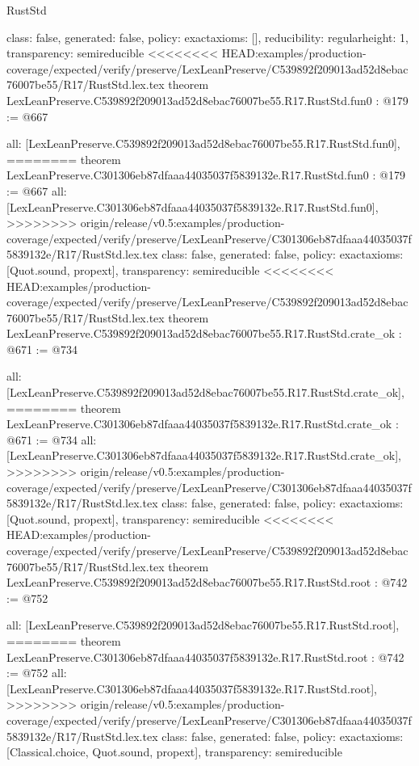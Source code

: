 \begin{lexlean}{RustStd}
\begin{coremodule}
{\begin{coremodule}
{{{  class: false,
  generated: false,
  policy: exact{axioms: []},
  reducibility: regular{height: 1},
  transparency: semireducible
}
<<<<<<<< HEAD:examples/production-coverage/expected/verify/preserve/LexLeanPreserve/C539892f209013ad52d8ebac76007be55/R17/RustStd.lex.tex
theorem LexLeanPreserve.C539892f209013ad52d8ebac76007be55.R17.RustStd.fun0 : @179 := @667 {
  all: [LexLeanPreserve.C539892f209013ad52d8ebac76007be55.R17.RustStd.fun0],
========
theorem LexLeanPreserve.C301306eb87dfaaa44035037f5839132e.R17.RustStd.fun0 : @179 := @667 {
  all: [LexLeanPreserve.C301306eb87dfaaa44035037f5839132e.R17.RustStd.fun0],
>>>>>>>> origin/release/v0.5:examples/production-coverage/expected/verify/preserve/LexLeanPreserve/C301306eb87dfaaa44035037f5839132e/R17/RustStd.lex.tex
  class: false,
  generated: false,
  policy: exact{axioms: [Quot.sound, propext]},
  transparency: semireducible
}
<<<<<<<< HEAD:examples/production-coverage/expected/verify/preserve/LexLeanPreserve/C539892f209013ad52d8ebac76007be55/R17/RustStd.lex.tex
theorem LexLeanPreserve.C539892f209013ad52d8ebac76007be55.R17.RustStd.crate_ok : @671 := @734 {
  all: [LexLeanPreserve.C539892f209013ad52d8ebac76007be55.R17.RustStd.crate_ok],
========
theorem LexLeanPreserve.C301306eb87dfaaa44035037f5839132e.R17.RustStd.crate_ok : @671 := @734 {
  all: [LexLeanPreserve.C301306eb87dfaaa44035037f5839132e.R17.RustStd.crate_ok],
>>>>>>>> origin/release/v0.5:examples/production-coverage/expected/verify/preserve/LexLeanPreserve/C301306eb87dfaaa44035037f5839132e/R17/RustStd.lex.tex
  class: false,
  generated: false,
  policy: exact{axioms: [Quot.sound, propext]},
  transparency: semireducible
}
<<<<<<<< HEAD:examples/production-coverage/expected/verify/preserve/LexLeanPreserve/C539892f209013ad52d8ebac76007be55/R17/RustStd.lex.tex
theorem LexLeanPreserve.C539892f209013ad52d8ebac76007be55.R17.RustStd.root : @742 := @752 {
  all: [LexLeanPreserve.C539892f209013ad52d8ebac76007be55.R17.RustStd.root],
========
theorem LexLeanPreserve.C301306eb87dfaaa44035037f5839132e.R17.RustStd.root : @742 := @752 {
  all: [LexLeanPreserve.C301306eb87dfaaa44035037f5839132e.R17.RustStd.root],
>>>>>>>> origin/release/v0.5:examples/production-coverage/expected/verify/preserve/LexLeanPreserve/C301306eb87dfaaa44035037f5839132e/R17/RustStd.lex.tex
  class: false,
  generated: false,
  policy: exact{axioms: [Classical.choice, Quot.sound, propext]},
  transparency: semireducible
}

}}}}}
\end{coremodule}}
\end{coremodule}
\end{lexlean}
